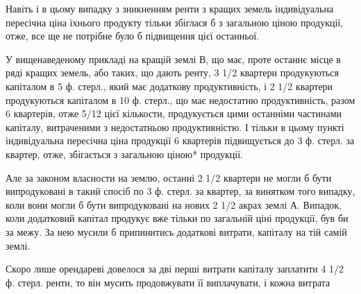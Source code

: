 Навіть і в цьому випадку з зникненням ренти з кращих земель індивідуальна
пересічна ціна їхнього продукту тільки збіглася б з загальною ціною продукції,
отже, все ще не потрібне було б підвищення цієї останньої.

У вищенаведеному прикладі на кращій землі В, що має, проте останнє
місце в ряді кращих земель, або таких, що дають ренту, 3  1/2 квартери продукуються
капіталом в 5 ф. стерл., який має додаткову продуктивність, і 2  1/2 квартери
продукуються капіталом в 10 ф. стерл., що має недостатню продуктивність,
разом 6 квартерів, отже 5/12 цієї кількости, продукується цими
останніми частинами капіталу, витраченими з недостатньою продуктивністю.
І тільки в цьому пункті індивідуальна пересічна ціна продукції 6 квартерів
підвищується до 3 ф. стерл. за квартер, отже, збігається з загальною ціною*
продукції.

Але за законом власности на землю, останні 2 1/2 квартери не могли б бути
випродуковані в такий спосіб по 3 ф. стерл. за квартер, за винятком того
випадку, коли вони могли б бути випродуковані на нових 2  1/2 акрах землі
А. Випадок, коли додатковий капітал продукує вже тільки по загальній ціні
продукції, був би за межу. За нею мусили б припинитись додаткові витрати,
капіталу на тій самій землі.

Скоро лише орендареві довелося за дві перші витрати капіталу заплатити
4  1/2 ф. стерл. ренти, то він мусить продовжувати її виплачувати, і кожна витрата
\parbreak{}  %
